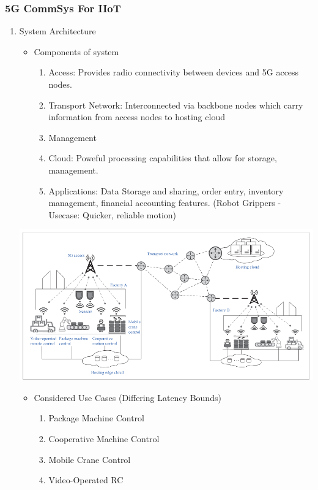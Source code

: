 \documentclass[11pt]{article}
\begin{document}
\subsubsection{5G CommSys For IIoT}
\label{sec:org60d64fc}
\begin{enumerate}
\item System Architecture
\label{sec:org176c44e}
\begin{itemize}
\item Components of system
\begin{enumerate}
\item Access: Provides radio connectivity between devices and 5G access nodes.
\item Transport Network: Interconnected via backbone nodes which carry information from access nodes to hosting cloud
\item Management
\item Cloud: Poweful processing capabilities that allow for storage, management.
\item Applications: Data Storage and sharing, order entry, inventory management, financial accounting features. (Robot Grippers - Usecase: Quicker, reliable motion)
\end{enumerate}
\end{itemize}
\begin{center}
\includegraphics[scale=0.50]{./assets/p1f1.png}
\end{center}
\begin{itemize}
\item Considered Use Cases (Differing Latency Bounds)
\begin{enumerate}
\item Package Machine Control
\item Cooperative Machine Control
\item Mobile Crane Control
\item Video-Operated RC

\end{enumerate}
\end{itemize}
\end{enumerate}
\end{document}
